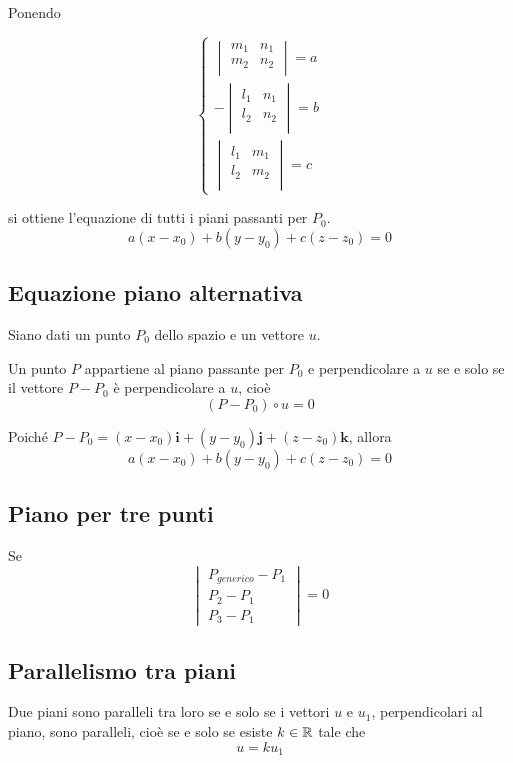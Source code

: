 Ponendo

$$
\begin{cases}
\begin{vmatrix}
m_1 & n_1 \\
m_2 & n_2 \\
\end{vmatrix} = a \\
- \begin{vmatrix}
l_1 & n_1 \\
l_2 & n_2 \\
\end{vmatrix} = b \\
\begin{vmatrix}
l_1 & m_1 \\
l_2 & m_2 \\
\end{vmatrix} = c
\end{cases}
$$

si ottiene l'equazione di tutti i piani passanti per $P_0$.
$$
a(x-x_0) + b(y-y_0) + c(z-z_0) = 0
$$

\subsection{Equazione piano alternativa}

Siano dati un punto $P_0$ dello spazio e un vettore $u$.

Un punto $P$ appartiene al piano passante per $P_0$ e perpendicolare a $u$ se e solo se il vettore $P-P_0$ è perpendicolare a $u$, cioè $$(P-P_0) \circ u =0$$

Poiché $P-P_0 = (x-x_0)\mathbf i + (y-y_0)\mathbf j +(z-z_0) \mathbf k$, allora $$ a(x-x_0) + b(y-y_0) +c(z-z_0) = 0$$

\subsection{Piano per tre punti}

Se
$$
\begin{vmatrix}
P_{generico} - P_1 \\
P_2 - P_1 \\
P_3 - P_1
\end{vmatrix} = 0
$$

\subsection{Parallelismo tra piani}

Due piani sono paralleli tra loro se e solo se i vettori $u$ e $u_1$, perpendicolari al piano, sono paralleli, cioè se e solo se esiste $k \in \mathbb{R}$ tale che $$u = k u_1$$

